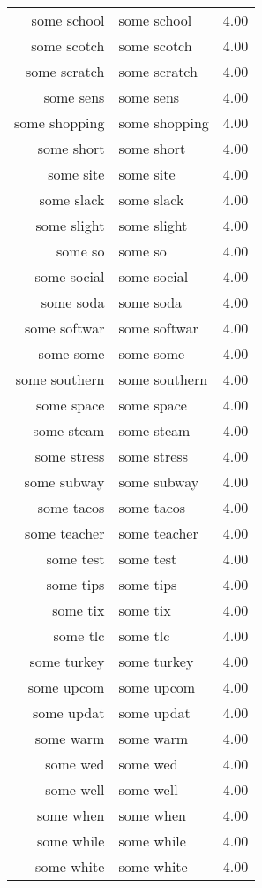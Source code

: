 \begin{table}[ht]
\begin{tabular}{rlr}
  some school & some school & 4.00 \\ 
  some scotch & some scotch & 4.00 \\ 
  some scratch & some scratch & 4.00 \\ 
  some sens & some sens & 4.00 \\ 
  some shopping & some shopping & 4.00 \\ 
  some short & some short & 4.00 \\ 
  some site & some site & 4.00 \\ 
  some slack & some slack & 4.00 \\ 
  some slight & some slight & 4.00 \\ 
  some so & some so & 4.00 \\ 
  some social & some social & 4.00 \\ 
  some soda & some soda & 4.00 \\ 
  some softwar & some softwar & 4.00 \\ 
  some some & some some & 4.00 \\ 
  some southern & some southern & 4.00 \\ 
  some space & some space & 4.00 \\ 
  some steam & some steam & 4.00 \\ 
  some stress & some stress & 4.00 \\ 
  some subway & some subway & 4.00 \\ 
  some tacos & some tacos & 4.00 \\ 
  some teacher & some teacher & 4.00 \\ 
  some test & some test & 4.00 \\ 
  some tips & some tips & 4.00 \\ 
  some tix & some tix & 4.00 \\ 
  some tlc & some tlc & 4.00 \\ 
  some turkey & some turkey & 4.00 \\ 
  some upcom & some upcom & 4.00 \\ 
  some updat & some updat & 4.00 \\ 
  some warm & some warm & 4.00 \\ 
  some wed & some wed & 4.00 \\ 
  some well & some well & 4.00 \\ 
  some when & some when & 4.00 \\ 
  some while & some while & 4.00 \\ 
  some white & some white & 4.00 \\ 

\end{tabular}
\end{table}
